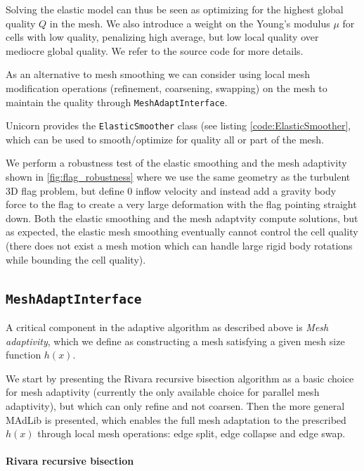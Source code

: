 Solving the elastic model can thus be seen as optimizing for the
highest global quality $Q$ in the mesh. We also introduce a weight on
the Young's modulus $\mu$ for cells with low quality, penalizing high
average, but low local quality over mediocre global quality. We refer
to the source code for more details.

As an alternative to mesh smoothing we can consider using local mesh
modification operations (refinement, coarsening, swapping) on the mesh
to maintain the quality \cite{CompereHoffmanEtAl2009}
through {\tt MeshAdaptInterface}.

Unicorn provides the {\tt ElasticSmoother} class (see
listing \ref{code:ElasticSmoother}, which can be used to
smooth/optimize for quality all or part of the mesh.

We perform a robustness test of the elastic smoothing and the mesh
adaptivity shown in \ref{fig:flag_robustness} where we use the same
geometry as the turbulent 3D flag problem, but define 0 inflow
velocity and instead add a gravity body force to the flag to create a
very large deformation with the flag pointing straight down. Both the
elastic smoothing and the mesh adaptvity compute solutions, but as
expected, the elastic mesh smoothing eventually cannot control the
cell quality (there does not exist a mesh motion which can handle
large rigid body rotations while bounding the cell quality).

\subsection{\tt MeshAdaptInterface}

A critical component in the adaptive algorithm as described above is
{\em Mesh adaptivity}, which we define as constructing a mesh
satisfying a given mesh size function $h(x)$.

We start by presenting the Rivara recursive bisection
algorithm \cite{Rivara1992} as a basic choice for mesh adaptivity
(currently the only available choice for parallel mesh adaptivity),
but which can only refine and not coarsen. Then the more general
MAdLib is presented, which enables the full mesh adaptation to the
prescribed $h(x)$ through local mesh operations: edge split, edge
collapse and edge swap.

\paragraph{Rivara recursive bisection}

